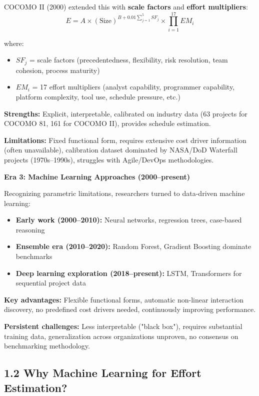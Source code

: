 \documentclass[11pt,a4paper]{article}
\begin{document}
COCOMO II (2000) extended this with \textbf{scale factors} and \textbf{effort multipliers}:
\begin{equation}
E = A \times (\text{Size})^{B + 0.01 \sum_{j=1}^{5} SF_j} \times \prod_{i=1}^{17} EM_i
\label{eq:cocomo2}
\end{equation}

where:
\begin{itemize}
    \item $SF_j$ = scale factors (precedentedness, flexibility, risk resolution, team cohesion, process maturity)
    \item $EM_i$ = 17 effort multipliers (analyst capability, programmer capability, platform complexity, tool use, schedule pressure, etc.)
\end{itemize}

\textbf{Strengths:} Explicit, interpretable, calibrated on industry data (63 projects for COCOMO 81, 161 for COCOMO II), provides schedule estimation.

\textbf{Limitations:} Fixed functional form, requires extensive cost driver information (often unavailable), calibration dataset dominated by NASA/DoD Waterfall projects (1970s--1990s), struggles with Agile/DevOps methodologies.

\textbf{Era 3: Machine Learning Approaches (2000--present)}

Recognizing parametric limitations, researchers turned to data-driven machine learning:
\begin{itemize}
    \item \textbf{Early work (2000--2010):} Neural networks, regression trees, case-based reasoning
    \item \textbf{Ensemble era (2010--2020):} Random Forest, Gradient Boosting dominate benchmarks
    \item \textbf{Deep learning exploration (2018--present):} LSTM, Transformers for sequential project data
\end{itemize}

\textbf{Key advantages:} Flexible functional forms, automatic non-linear interaction discovery, no predefined cost drivers needed, continuously improving performance.

\textbf{Persistent challenges:} Less interpretable ("black box"), requires substantial training data, generalization across organizations unproven, no consensus on benchmarking methodology.

\subsection{1.2 Why Machine Learning for Effort Estimation?}
\end{document}
